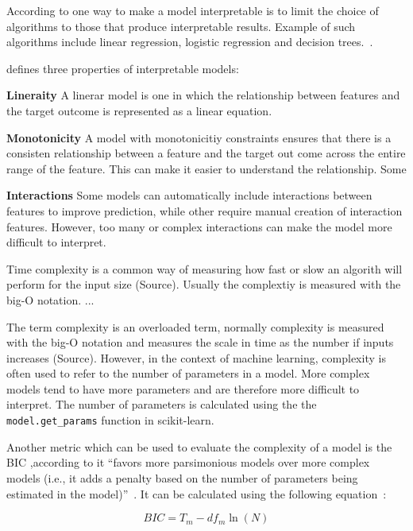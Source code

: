 According to \cite{molnar2020interpretable} one way to make a model interpretable is to limit the
choice of algorithms to those that produce interpretable results. Example of such
algorithms include linear regression, logistic regression and decision trees.~\cite[p.
35]{molnar2020interpretable}.

\cite{molnar2020interpretable} defines three properties of interpretable models:

\textbf{Lineraity} A linerar model is one in which the relationship between features and the
target outcome is represented as a linear equation.

\textbf{Monotonicity} A model with monotonicitiy constraints ensures that there is a consisten
relationship between a feature and the target out come across the entire range of the feature.
This can make it easier to understand the relationship. Some

\textbf{Interactions} Some models can automatically include
interactions between features to improve prediction, while other require manual creation of
interaction features. However, too many or complex interactions can make the model more
difficult to interpret.


Time complexity is a common way of measuring how fast or slow an algorith will perform for the
input size (Source). Usually the complextiy is measured with the big-O notation.
...

The term complexity is an overloaded term, normally complexity is measured with the big-O
notation and measures the scale in time as the number if inputs increases (Source).
However, in the context of machine learning, complexity is often used to refer to the
number of parameters in a model.
More complex models tend to have more parameters and are therefore more difficult to interpret.
The number of parameters is calculated using the the \texttt{model.get\_params} function
in scikit-learn.

Another metric which can be used to evaluate the complexity of a model is the \ac{BIC}
\cite{schwarz1978estimating},according
to \cite{bauldry2015structural} it ``favors more parsimonious models over more complex
models (i.e., it adds a penalty based on the number of
parameters being estimated in the model)''~\cite[p. 618]{bauldry2015structural}. It can be
calculated using the following equation~\cite[p. 618]{bauldry2015structural}:

\begin{tcolorbox}[arc=0pt,boxrule=0.5pt]
    \begin{equation}
        BIC = T_m - df_m  \ln(N)
        \label{eq:bic}
    \end{equation}
\end{tcolorbox}

